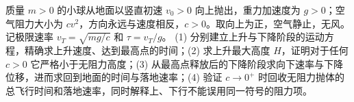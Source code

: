 质量 \(m>0\) 的小球从地面以竖直初速 \(v_0>0\) 向上抛出，重力加速度为 \(g>0\)；空气阻力大小为 \(c v^2\)，方向永远与速度相反，\(c>0\)。取向上为正，空气静止，无风。记极限速率 \(v_T=\sqrt{mg/c}\) 和 \(\tau=v_T/g\)。
(1) 分别建立上升与下降阶段的运动方程，精确求上升速度、达到最高点的时间；(2) 求上升最大高度 \(H\)，证明对于任何 \(c>0\) 它严格小于无阻力高度；(3) 从最高点释放后的下降阶段求向下速率与下降位移，进而求回到地面的时间与落地速率；(4) 验证 \(c\to0^+\) 时回收无阻力抛体的总飞行时间和落地速率，同时解释上、下行不能误用同一符号的阻力项。
